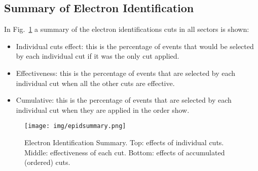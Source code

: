 \subsection{Summary of Electron Identification }
In Fig.~\ref{fig:epidsummary} a summary of the electron identifications cuts in all sectors is shown:

\begin{itemize}
	\item Individual cuts effect: this is the percentage of events that would be selected by each
	individual cut if it was the only cut applied.
	\item Effectiveness: this is the percentage of events that are selected by each individual cut when
	all the other cuts are effective.
	\item Cumulative: this is the percentage of events that are selected by each individual cut when
	they are applied in the order show.
\end{itemize}


\begin{figure}[hb]
  \centering
		\texttt{[image: img/epidsummary.png]}
		\caption{Electron Identification Summary. Top: effects of individual cuts.
		         Middle: effectiveness of each cut.
               Bottom: effects of accumulated (ordered) cuts.}
 		\label{fig:epidsummary}
\end{figure}



\clearpage\newpage










